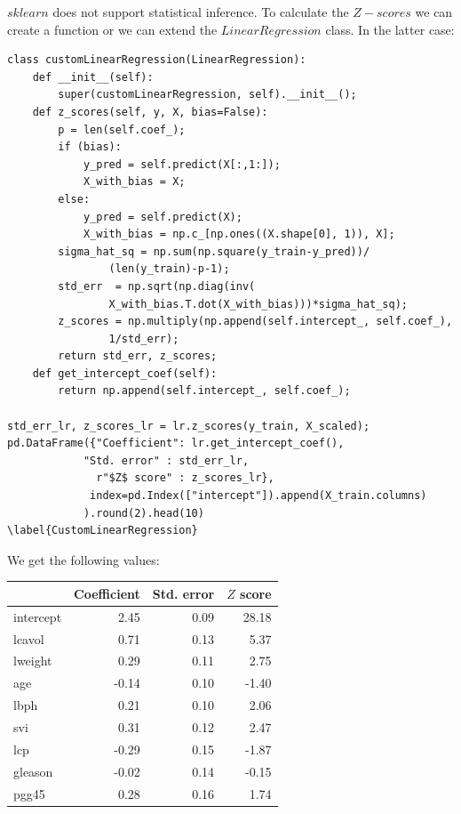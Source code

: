 \documentclass[12pt, letterpaper]{article}
\theoremstyle{definition}
\begin{document}
$sklearn$ does not support statistical inference. To calculate the $Z-scores$ we can create a function or we can extend the $LinearRegression$ class. In the latter case:
\begin{lstlisting}
class customLinearRegression(LinearRegression):
    def __init__(self):
        super(customLinearRegression, self).__init__();
    def z_scores(self, y, X, bias=False):
        p = len(self.coef_);
        if (bias):
            y_pred = self.predict(X[:,1:]);
            X_with_bias = X;
        else:
            y_pred = self.predict(X);
            X_with_bias = np.c_[np.ones((X.shape[0], 1)), X];
        sigma_hat_sq = np.sum(np.square(y_train-y_pred))/
        		(len(y_train)-p-1);
        std_err  = np.sqrt(np.diag(inv(
        		X_with_bias.T.dot(X_with_bias)))*sigma_hat_sq);
        z_scores = np.multiply(np.append(self.intercept_, self.coef_),
        		1/std_err);
        return std_err, z_scores;
    def get_intercept_coef(self):
        return np.append(self.intercept_, self.coef_);
        
std_err_lr, z_scores_lr = lr.z_scores(y_train, X_scaled);
pd.DataFrame({"Coefficient": lr.get_intercept_coef(), 
			"Std. error" : std_err_lr,
              r"$Z$ score" : z_scores_lr},
             index=pd.Index(["intercept"]).append(X_train.columns)
            ).round(2).head(10)
\label{CustomLinearRegression}
\end{lstlisting}
We get the following values:

\begin{tabular}{lrrr}
\toprule
{} &  Coefficient &  Std. error &  $Z$ score \\
\midrule
intercept &         2.45 &        0.09 &      28.18 \\
lcavol    &         0.71 &        0.13 &       5.37 \\
lweight   &         0.29 &        0.11 &       2.75 \\
age       &        -0.14 &        0.10 &      -1.40 \\
lbph      &         0.21 &        0.10 &       2.06 \\
svi       &         0.31 &        0.12 &       2.47 \\
lcp       &        -0.29 &        0.15 &      -1.87 \\
gleason   &        -0.02 &        0.14 &      -0.15 \\
pgg45     &         0.28 &        0.16 &       1.74 \\
\bottomrule
\end{tabular}
\end{document}
